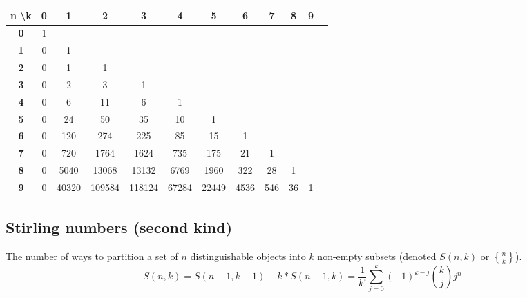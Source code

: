 \begin{center}
    \begin{tabular}{|c|c|c|c|c|c|c|c|c|c|c|c|}
        \hline
        \textbf{n \textbackslash \text{ }k} & \textbf{0} & \textbf{1} & \textbf{2} & \textbf{3} & \textbf{4} & \textbf{5} & \textbf{6} & \textbf{7} & \textbf{8} & \textbf{9} \\
        \hline
        \textbf{0} & 1 & & & & & & & & & \\
        \hline
        \textbf{1} & 0 & 1 & & & & & & & & \\
        \hline
        \textbf{2} & 0 & 1 & 1 & & & & & & & \\
        \hline
        \textbf{3} & 0 & 2 & 3 & 1 & & & & & & \\
        \hline
        \textbf{4} & 0 & 6 & 11 & 6 & 1 & & & & & \\
        \hline
        \textbf{5} & 0 & 24 & 50 & 35 & 10 & 1 & & & & \\
        \hline
        \textbf{6} & 0 & 120 & 274 & 225 & 85 & 15 & 1 & & & \\
        \hline
        \textbf{7} & 0 & 720 & 1764 & 1624 & 735 & 175 & 21 & 1 & & \\
        \hline
        \textbf{8} & 0 & 5040 & 13068 & 13132 & 6769 & 1960 & 322 & 28 & 1 & \\
        \hline
        \textbf{9} & 0 & 40320 & 109584 & 118124 & 67284 & 22449 & 4536 & 546 & 36 & 1 \\
        \hline
    \end{tabular}
\end{center}



\subsection*{Stirling numbers (second kind)}

The number of ways to partition a set of $n$ distinguishable objects into $k$ non-empty subsets (denoted $S(n, k)$ or $\genfrac{\{}{\}}{0pt}{}{n}{k}$).
$$S(n, k) = S(n-1, k-1) + k*S(n-1, k) = \frac{1}{k!} \sum_{j=0}^k (-1)^{k-j} \binom{k}{j} j^n$$

